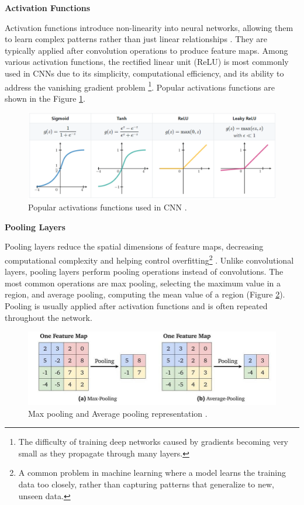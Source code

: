 \documentclass[a4paper,10pt]{book}
\begin{document}
\textbf{Activation Functions}

Activation functions introduce non-linearity into neural networks, allowing them to learn complex patterns rather than just linear relationships \cite{langActivationFunctionsNeural2024}. They are typically applied after convolution operations to produce feature maps. Among various activation functions, the rectified linear unit (ReLU) is most commonly used in CNNs due to its simplicity, computational efficiency, and its ability to address the vanishing gradient problem \footnote{The difficulty of training deep networks caused by gradients becoming very small as they propagate through many layers.}. Popular activations functions are shown in the Figure \ref{fig:activations-functions}.

\begin{figure}
    \centering
    \includegraphics[width=1.0\linewidth]{reports//assets/activations_functions.png}
    \caption[Popular activation functions]{Popular activations functions used in CNN \cite{wachtelUnderstandingActivationFunctions2021}.}
    \label{fig:activations-functions}
\end{figure}

\textbf{Pooling Layers}

Pooling layers reduce the spatial dimensions of feature maps, decreasing computational complexity and helping control overfitting\footnote{A common problem in machine learning where a model learns the training data too closely, rather than capturing patterns that generalize to new, unseen data.} \cite{brownlee_gentle_2019}. Unlike convolutional layers, pooling layers perform pooling operations instead of convolutions. The most common operations are max pooling, selecting the maximum value in a region, and average pooling, computing the mean value of a region (Figure \ref{fig:pooling_operations}). Pooling is usually applied after activation functions and is often repeated throughout the network.


\begin{figure}[h!]
    \centering
    \includegraphics[width=1.0\linewidth]{reports//assets/pooling.jpg}
    \caption[Popular pooling operations]{Max pooling and Average pooling representation \cite{SkinLesionClassification}.}
    \label{fig:pooling_operations}
\end{figure}
\end{document}
